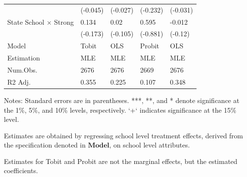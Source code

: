 \begin{table}[ht]
\begin{threeparttable}
\begin{tabular}{lllll}
 & (-0.045) & (-0.027) & (-0.232) & (-0.031) \\
State School × Strong & 0.134 & 0.02 & 0.595 & -0.012 \\
 & (-0.173) & (-0.105) & (-0.881) & (-0.12) \\
\midrule
Model   & Tobit    & OLS      & Probit   & OLS      \\
Estimation & MLE & MLE & MLE & MLE \\
Num.Obs.& 2676     & 2676     & 2669     & 2676    \\
R2 Adj. & 0.355    & 0.225    & 0.107    & 0.348   \\
\bottomrule
\end{tabular}
\begin{tablenotes}
    \footnotesize
    \item[*] Notes: Standard errors are in parentheses. ***, **, and * denote significance at the 1\%, 5\%, and 10\% levels, respectively. `+` indicates significance at the 15\% level. 
    \item Estimates are obtained  by regressing school level treatment effects, derived from the specification denoted in $\mathbf{Model}$, on school level attributes.
    \item Estimates for Tobit and Probit are not the marginal effects, but the estimated coefficients.
\end{tablenotes}
\end{threeparttable}
\end{table}
